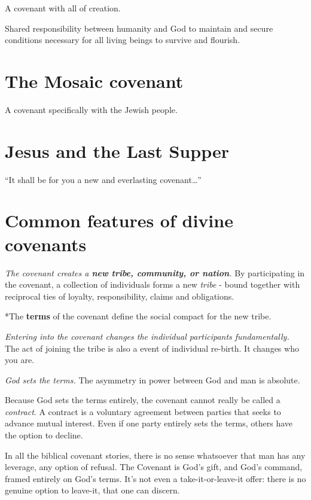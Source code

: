 \documentclass[
]{book}
\begin{document}
A covenant with all of creation.

Shared responsibility between humanity and God to maintain and secure
conditions necessary for all living beings to survive and flourish.

\hypertarget{the-mosaic-covenant}{%
\section{The Mosaic covenant}\label{the-mosaic-covenant}}

A covenant specifically with the Jewish people.

\hypertarget{jesus-and-the-last-supper}{%
\section{Jesus and the Last Supper}\label{jesus-and-the-last-supper}}

``It shall be for you a new and everlasting covenant\ldots{}''

\hypertarget{common-features-of-divine-covenants}{%
\section{Common features of divine covenants}\label{common-features-of-divine-covenants}}

\emph{The covenant creates a \textbf{new tribe, community, or nation}.} By participating in the covenant, a collection of individuals forms a new \emph{tribe} - bound together with reciprocal ties of loyalty, responsibility, claims and obligations.

*The \textbf{terms} of the covenant define the social compact for the new tribe.

\emph{Entering into the covenant changes the individual participants fundamentally.} The act of joining the tribe is also a event of individual re-birth. It changes who you are.

\emph{God sets the terms.} The asymmetry in power between God and man is absolute.

Because God sets the terms entirely, the covenant cannot really be called a \emph{contract}. A contract is a voluntary agreement between parties that seeks to advance mutual interest. Even if one party entirely sets the terms, others have the option to decline.

In all the biblical covenant stories, there is no sense whatsoever that man has any leverage, any option of refusal. The Covenant is God's gift, and God's command, framed entirely on God's terms. It's not even a take-it-or-leave-it offer: there is no genuine option to leave-it, that one can discern.
\end{document}
